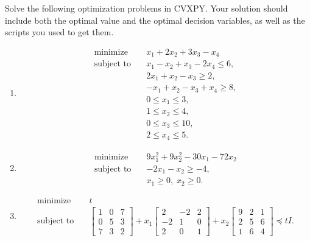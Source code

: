 \documentclass[11pt,letter,notitlepage]{article}
\theoremstyle{definition}
\begin{document}
\newpage
\begin{exercise}
Solve the following optimization problems in CVXPY. Your solution should include both the optimal
value and the optimal decision variables, as well as the scripts you used to get them.

\begin{enumerate}[label=(\alph*)]
    \item
    \[
    \begin{aligned}
    \text{minimize} \quad & x_1 + 2x_2 + 3x_3 - x_4 \\
    \text{subject to} \quad
    & x_1 - x_2 + x_3 - 2x_4 \le 6, \\
    & 2x_1 + x_2 - x_3 \ge 2, \\
    & -x_1 + x_2 - x_3 + x_4 \ge 8, \\
    & 0 \le x_1 \le 3, \\
    & 1 \le x_2 \le 4, \\
    & 0 \le x_3 \le 10, \\
    & 2 \le x_4 \le 5.
    \end{aligned}
    \]

    \item
    \[
    \begin{aligned}
    \text{minimize} \quad & 9x_1^2 + 9x_2^2 - 30x_1 - 72x_2 \\
    \text{subject to} \quad
    & -2x_1 - x_2 \ge -4, \\
    & x_1 \ge 0,\; x_2 \ge 0.
    \end{aligned}
    \]

    \item
    \[
    \begin{aligned}
    \text{minimize} \quad & t \\
    \text{subject to} \quad
    &
    \begin{bmatrix}
    1 & 0 & 7 \\
    0 & 5 & 3 \\
    7 & 3 & 2
    \end{bmatrix}
    + x_1
    \begin{bmatrix}
    2 & -2 & 2 \\
    -2 & 1 & 0 \\
    2 & 0 & 1
    \end{bmatrix}
    + x_2
    \begin{bmatrix}
    9 & 2 & 1 \\
    2 & 5 & 6 \\
    1 & 6 & 4
    \end{bmatrix}
    \preceq tI.
    \end{aligned}
    \]
\end{enumerate}
\end{exercise}
\end{document}
